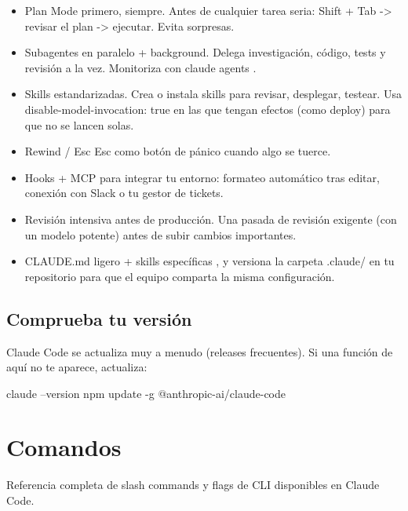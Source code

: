 \documentclass[11pt,a4paper]{book}
\begin{document}
\begin{itemize}\item Plan Mode primero, siempre. Antes de cualquier tarea seria: Shift + Tab -> revisar el plan -> ejecutar. Evita sorpresas.\end{itemize}
\begin{itemize}\item Subagentes en paralelo + background. Delega investigación, código, tests y revisión a la vez. Monitoriza con claude agents .\end{itemize}
\begin{itemize}\item Skills estandarizadas. Crea o instala skills para revisar, desplegar, testear. Usa disable-model-invocation: true en las que tengan efectos (como deploy) para que no se lancen solas.\end{itemize}
\begin{itemize}\item Rewind / Esc Esc como botón de pánico cuando algo se tuerce.\end{itemize}
\begin{itemize}\item Hooks + MCP para integrar tu entorno: formateo automático tras editar, conexión con Slack o tu gestor de tickets.\end{itemize}
\begin{itemize}\item Revisión intensiva antes de producción. Una pasada de revisión exigente (con un modelo potente) antes de subir cambios importantes.\end{itemize}
\begin{itemize}\item CLAUDE.md ligero + skills específicas , y versiona la carpeta .claude/ en tu repositorio para que el equipo comparta la misma configuración.\end{itemize}
\section{Comprueba tu versión}
Claude Code se actualiza muy a menudo (releases frecuentes). Si una función de aquí no te aparece, actualiza:

\begin{codebox}
claude --version
npm update -g @anthropic-ai/claude-code
\end{codebox}
\chapter{Comandos}
Referencia completa de slash commands y flags de CLI disponibles en Claude Code.
\end{document}
